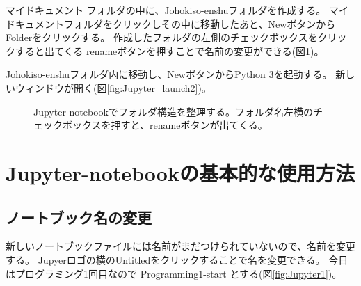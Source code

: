 マイドキュメント フォルダの中に、Johokiso-enshuフォルダを作成する。
マイドキュメントフォルダをクリックしその中に移動したあと、NewボタンからFolderをクリックする。
作成したフォルダの左側のチェックボックスをクリックすると出てくる renameボタンを押すことで名前の変更ができる(図\ref{fig:Jupyter_launch1})。

Johokiso-enshuフォルダ内に移動し、NewボタンからPython 3を起動する。
新しいウィンドウが開く(図\ref{fig:Jupyter_launch2})。



\begin{figure}[htbp]
	\centering
	\caption{
		\label{fig:Jupyter_launch1}
		Jupyter-notebookでフォルダ構造を整理する。フォルダ名左横のチェックボックスを押すと、{\ttfamily rename}ボタンが出てくる。
	}
\end{figure}





\section{Jupyter-notebookの基本的な使用方法}
\subsection{ノートブック名の変更}
新しいノートブックファイルには名前がまだつけられていないので、名前を変更する。
Jupyerロゴの横のUntitledをクリックすることで名を変更できる。
今日はプログラミング1回目なので Programming1-start とする(図\ref{fig:Jupyter1})。

